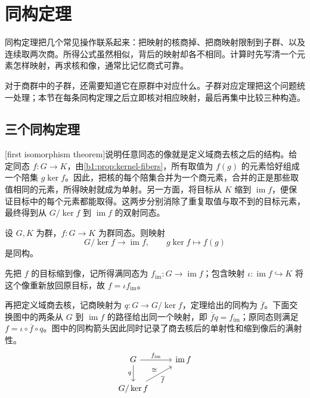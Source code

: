 
\section{同构定理}
\label{b1:sec:0204}

%
%
%

同构定理把几个常见操作联系起来：把映射的核商掉、把商映射限制到子群、以及连续取两次商。所得公式虽然相似，背后的映射却各不相同。计算时先写清一个元素怎样映射，再求核和像，通常比记忆商式可靠。

\ProseParagraphBreak
对于商群中的子群，还需要知道它在原群中对应什么。子群对应定理把这个问题统一处理；本节在每条同构定理之后立即核对相应映射，最后再集中比较三种构造。

\subsection{三个同构定理}
\label{b1:subsec:0204:01}

[first isomorphism theorem]说明任意同态的像就是定义域商去核之后的结构。给定同态 \(f:G\rightarrow K\)，由\cref{b1:prop:kernel-fibers}，所有取值为 \(f(g)\) 的元素恰好组成一个陪集 \(g\ker f\)。因此，把核的每个陪集合并为一个商元素，合并的正是那些取值相同的元素，所得映射就成为单射。另一方面，将目标从 \(K\) 缩到 \(\operatorname{im}f\)，便保证目标中的每个元素都能取得。这两步分别消除了重复取值与取不到的目标元素，最终得到从 \(G/\ker f\) 到 \(\operatorname{im}f\) 的双射同态。
\begin{theorem}[第一同构定理]\label{b1:thm:first-isomorphism}
	设 \(G,K\) 为群，\(f:G\rightarrow K\) 为群同态。则映射
	\[
		G/\ker f\longrightarrow\operatorname{im}f,\qquad g\ker f\longmapsto f(g)
	\]
	是同构。
\end{theorem}

先把 \(f\) 的目标缩到像，记所得满同态为 \(f_{\operatorname{im}}:G\rightarrow\operatorname{im}f\)；包含映射 \(\iota:\operatorname{im}f\hookrightarrow K\) 将这个像重新放回原目标，故 \(f=\iota f_{\operatorname{im}}\)。

\ProseParagraphBreak
再把定义域商去核，记商映射为 \(q:G\rightarrow G/\ker f\)，定理给出的同构为 \(\overline f\)。下面交换图中的两条从 \(G\) 到 \(\operatorname{im}f\) 的路径给出同一个映射，即 \(\overline f q=f_{\operatorname{im}}\)；原同态则满足 \(f=\iota\circ\overline f\circ q\)。图中的同构箭头因此同时记录了商去核后的单射性和缩到像后的满射性。
\[
	\begin{tikzcd}
		G \arrow[r,"f_{\operatorname{im}}"] \arrow[d,"q"'] & \operatorname{im}f \\
		G/\ker f \arrow[ur,"\overline f"',"\cong"] &
	\end{tikzcd}
\]

